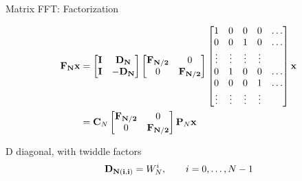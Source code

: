 \begin{myframe}{Matrix FFT: Factorization}
\centering

\begin{align*}
\mathbf{F_N} \mathbf{x} &=  
\begin{bmatrix}
\mathbf{I} &  \mathbf{D_N} \\
\mathbf{I} &  \mathbf{-D_N}
\end{bmatrix}  
\begin{bmatrix}
\mathbf{F_{N/2}} & 0 \\
0 & \mathbf{F_{N/2}} 
\end{bmatrix}  
\begin{bmatrix}
1 & 0 & 0 & 0 & \dots  \\
0 & 0 & 1 & 0 & \dots \\
\vdots & \vdots & \vdots &  \vdots &  \\
0 & 1 & 0 & 0 &  \dots  \\
0 & 0 & 0 & 1 & \dots \\
\vdots & \vdots & \vdots & \vdots & 
\end{bmatrix}  \mathbf{x}
\\
&=  
\mathbf{C}_N
\begin{bmatrix}
\mathbf{F_{N/2}} & 0 \\
0 & \mathbf{F_{N/2}}
\end{bmatrix}  
\mathbf{P}_N
\mathbf{x}
\end{align*}

\begin{block}{D diagonal, with twiddle factors}
\begin{equation}
\mathbf{D_{N(i,i)}}= W_N^{i}, \qquad i=0,\dots, N-1
\end{equation}
\end{block}

\end{myframe}

